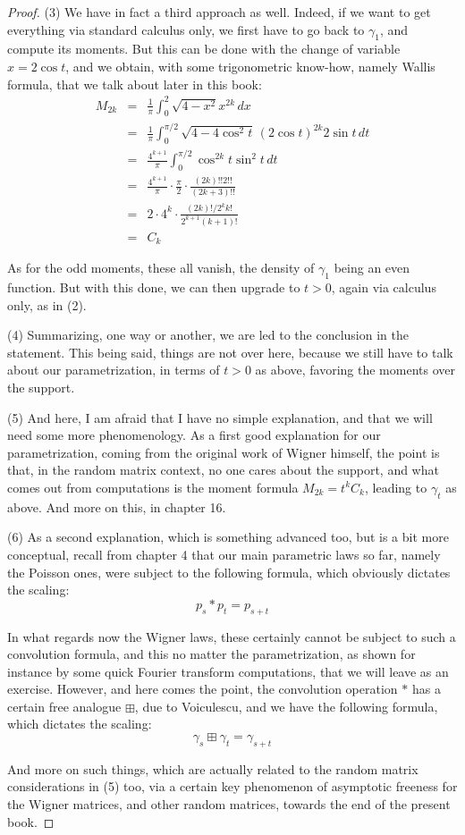 \documentclass[12pt]{amsbook}
\begin{document}
\begin{proof}
(3) We have in fact a third approach as well. Indeed, if we want to get everything via standard calculus only, we first have to go back to $\gamma_1$, and compute its moments. But this can be done with the change of variable $x=2\cos t$, and we obtain, with some trigonometric know-how, namely Wallis formula, that we talk about later in this book:
\begin{eqnarray*}
M_{2k}
&=&\frac{1}{\pi}\int_0^2\sqrt{4-x^2}x^{2k}\,dx\\
&=&\frac{1}{\pi}\int_0^{\pi/2}\sqrt{4-4\cos^2t}\,(2\cos t)^{2k}2\sin t\,dt\\
&=&\frac{4^{k+1}}{\pi}\int_0^{\pi/2}\cos^{2k}t\sin^2t\,dt\\
&=&\frac{4^{k+1}}{\pi}\cdot\frac{\pi}{2}\cdot\frac{(2k)!!2!!}{(2k+3)!!}\\
&=&2\cdot 4^k\cdot\frac{(2k)!/2^kk!}{2^{k+1}(k+1)!}\\
&=&C_k
\end{eqnarray*}

As for the odd moments, these all vanish, the density of $\gamma_1$ being an even function. But with this done, we can then upgrade to $t>0$, again via calculus only, as in (2).

\medskip

(4) Summarizing, one way or another, we are led to the conclusion in the statement. This being said, things are not over here, because we still have to talk about our parametrization, in terms of $t>0$ as above, favoring the moments over the support.

\medskip

(5) And here, I am afraid that I have no simple explanation, and that we will need some more phenomenology. As a first good explanation for our parametrization, coming from the original work of Wigner himself, the point is that, in the random matrix context, no one cares about the support, and what comes out from computations is the moment formula $M_{2k}=t^kC_k$, leading to $\gamma_t$ as above. And more on this, in chapter 16.

\medskip

(6) As a second explanation, which is something advanced too, but is a bit more conceptual, recall from chapter 4 that our main parametric laws so far, namely the Poisson ones, were subject to the following formula, which obviously dictates the scaling:
$$p_s*p_t=p_{s+t}$$

 In what regards now the Wigner laws, these certainly cannot be subject to such a convolution formula, and this no matter the parametrization, as shown for instance by some quick Fourier transform computations, that we will leave as an exercise. However, and here comes the point, the convolution operation $*$ has a certain free analogue $\boxplus$, due to Voiculescu, and we have the following formula, which dictates the scaling:
$$\gamma_s\boxplus\gamma_t=\gamma_{s+t}$$

And more on such things, which are actually related to the random matrix considerations in (5) too, via a certain key phenomenon of asymptotic freeness for the Wigner matrices, and other random matrices, towards the end of the present book.
\end{proof}
\end{document}

